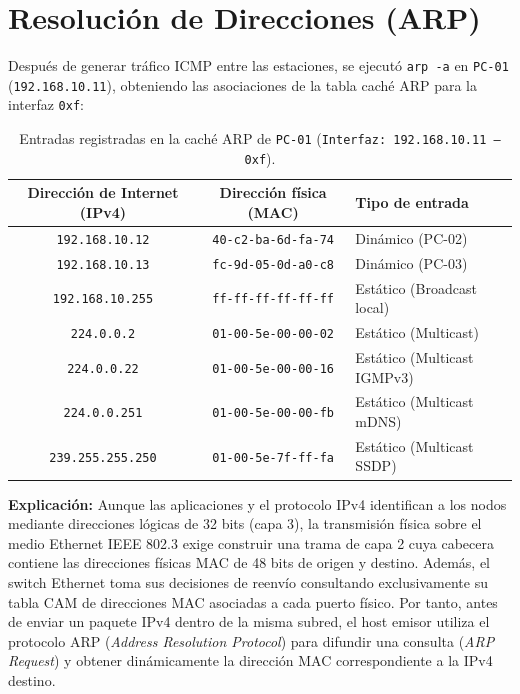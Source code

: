 \documentclass[11pt, a4paper]{article}
\begin{document}
\section{Resolución de Direcciones (ARP)}

Después de generar tráfico ICMP entre las estaciones, se ejecutó \texttt{arp -a} en \texttt{PC-01} (\texttt{192.168.10.11}), obteniendo las asociaciones de la tabla caché ARP para la interfaz \texttt{0xf}:

\begin{table}[h!]
\centering
\small
\setlength{\tabcolsep}{5pt}
\caption{Entradas registradas en la caché ARP de \texttt{PC-01} (\texttt{Interfaz: 192.168.10.11 --- 0xf}).}
\begin{tabularx}{\textwidth}{cc>{\raggedright\arraybackslash}X}
\toprule
\textbf{Dirección de Internet (IPv4)} & \textbf{Dirección física (MAC)} & \textbf{Tipo de entrada} \\
\midrule
\texttt{192.168.10.12} & \texttt{40-c2-ba-6d-fa-74} & Dinámico (PC-02) \\
\texttt{192.168.10.13} & \texttt{fc-9d-05-0d-a0-c8} & Dinámico (PC-03) \\
\texttt{192.168.10.255} & \texttt{ff-ff-ff-ff-ff-ff} & Estático (Broadcast local) \\
\texttt{224.0.0.2} & \texttt{01-00-5e-00-00-02} & Estático (Multicast) \\
\texttt{224.0.0.22} & \texttt{01-00-5e-00-00-16} & Estático (Multicast IGMPv3) \\
\texttt{224.0.0.251} & \texttt{01-00-5e-00-00-fb} & Estático (Multicast mDNS) \\
\texttt{239.255.255.250} & \texttt{01-00-5e-7f-ff-fa} & Estático (Multicast SSDP) \\
\bottomrule
\end{tabularx}
\end{table}

\noindent \textbf{Explicación:} Aunque las aplicaciones y el protocolo IPv4 identifican a los nodos mediante direcciones lógicas de 32 bits (capa 3), la transmisión física sobre el medio Ethernet IEEE 802.3 exige construir una trama de capa 2 cuya cabecera contiene las direcciones físicas MAC de 48 bits de origen y destino. Además, el switch Ethernet toma sus decisiones de reenvío consultando exclusivamente su tabla CAM de direcciones MAC asociadas a cada puerto físico. Por tanto, antes de enviar un paquete IPv4 dentro de la misma subred, el host emisor utiliza el protocolo ARP (\textit{Address Resolution Protocol}) para difundir una consulta (\textit{ARP Request}) y obtener dinámicamente la dirección MAC correspondiente a la IPv4 destino.
\end{document}
